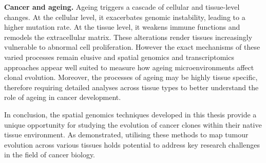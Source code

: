 \textbf{Cancer and ageing.} Ageing triggers a cascade of cellular and tissue-level changes. At the cellular level, it exacerbates genomic instability, leading to a higher mutation rate. At the tissue level, it weakens immune functions and remodels the extracellular matrix. These alterations render tissues increasingly vulnerable to abnormal cell proliferation. However the exact mechanisms of these varied processes remain elusive and spatial genomics and transcriptomics approaches appear well suited to measure how ageing microenvironments affect clonal evolution. Moreover, the processes of ageing may be highly tissue specific, therefore requiring detailed analyses across tissue types to better understand the role of ageing in cancer development.

In conclusion, the spatial genomics techniques developed in this thesis provide a unique opportunity for studying the evolution of cancer clones within their native tissue environment. As demonstrated, utilising these methods to map tumour evolution across various tissues holds potential to address key research challenges in the field of cancer biology.